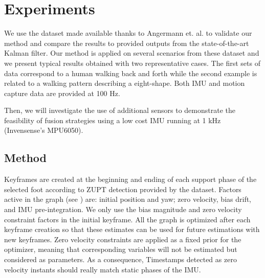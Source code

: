 
\section{Experiments} \label{sec:experiments}

We use the dataset made available thanks to Angermann et. al. \cite{angermann2010high} to validate our method and compare the results to provided outputs from the state-of-the-art Kalman filter.
Our method is applied on several scenarios from these dataset and we present typical results obtained with two representative cases. The first sets of data correspond to a human walking back and forth 
while the second example is related to a walking pattern describing a eight-shape. Both IMU and motion capture data are provided at 100 Hz.

Then, we will investigate the use of additional sensors to demonstrate the feasibility of fusion strategies using a low cost IMU running at 1 kHz (Invensense's MPU6050).


\subsection{Method}

Keyframes are created at the beginning and ending of each support phase of the selected foot according to ZUPT detection provided by the dataset. Factors active in the graph (see ) are: initial position and yaw; zero velocity, bias drift, and IMU pre-integration. We only use the bias magnitude 
and zero velocity constraint factors in the initial keyframe. All the graph is optimized after each keyframe creation so that these estimates can be used for future estimations with new keyframes. Zero velocity constraints are applied 
as a fixed prior for the optimizer, meaning that corresponding variables will not be estimated but considered as parameters. 
As a consequence, Timestamps detected as zero velocity instants should really match static phases of the IMU. 

